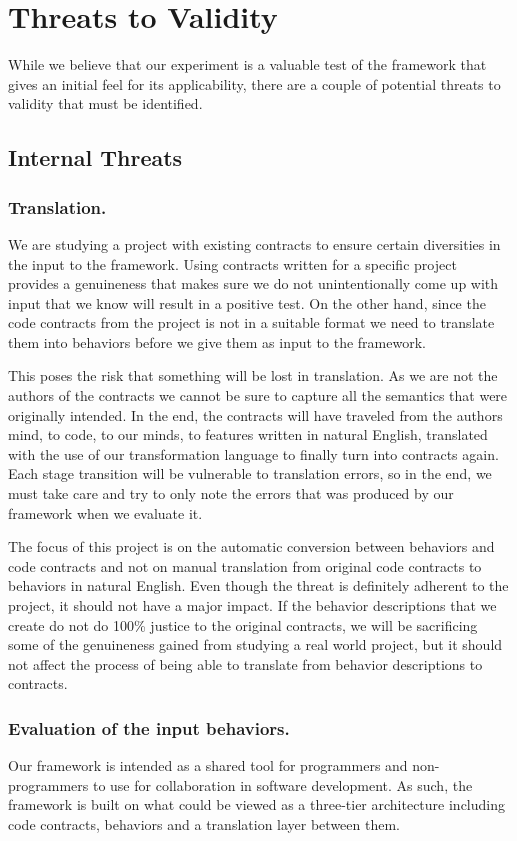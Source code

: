 \section{Threats to Validity}
\label{sec:Threats}
While we believe that our experiment is a valuable test of the framework that gives an initial feel for its applicability, there are a couple of potential threats to validity that must be identified.

\subsection{Internal Threats}
\subsubsection{Translation.}
We are studying a project with existing contracts to ensure certain diversities in the input to the framework.
Using contracts written for a specific project provides a genuineness that makes sure we do not unintentionally come up with input that we know will result in a positive test.
On the other hand, since the code contracts from the project is not in a suitable format we need to translate them into behaviors before we give them as input to the framework.
 
This poses the risk that something will be lost in translation.
As we are not the authors of the contracts we cannot be sure to capture all the semantics that were originally intended.
In the end, the contracts will have traveled from the authors mind, to code, to our minds, to features written in natural English, translated with the use of our transformation language to finally turn into contracts again.
Each stage transition will be vulnerable to translation errors, so in the end, we must take care and try to only note the errors that was produced by our framework when we evaluate it.
 
The focus of this project is on the automatic conversion between behaviors and code contracts and not on manual translation from original code contracts to behaviors in natural English. Even though the threat is definitely adherent to the project, it should not have a major impact.
If the behavior descriptions that we create do not do 100\%  justice to the original contracts, we will be sacrificing some of the genuineness gained from studying a real world project, but it should not affect the process of being able to translate from behavior descriptions to contracts.

\subsubsection{Evaluation of the input behaviors.}
Our framework is intended as a shared tool for programmers and non-programmers to use for collaboration in software development.
As such, the framework is built on what could be viewed as a three-tier architecture including code contracts, behaviors and a translation layer between them.
 
